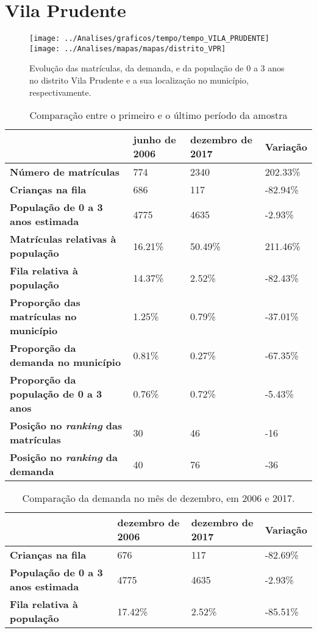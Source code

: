 \section{Vila Prudente}
\begin{figure}[H]
\centering
\texttt{[image: ../Analises/graficos/tempo/tempo\_VILA\_PRUDENTE]}
\texttt{[image: ../Analises/mapas/mapas/distrito\_VPR]}
\caption{Evolução das matrículas, da demanda, e da população de 0 a 3 anos no distrito Vila Prudente e a sua localização no município, respectivamente.}
\end{figure}
\begin{table}[H]
\begin{tabular}{l|l|l|l}
\textbf{}                                      & \textbf{junho de 2006}       & \textbf{dezembro de 2017}    & \textbf{Variação} \\ \hline
\textbf{Número de matrículas}                  & 774 & 2340 & 202.33\% \\ \hline
\textbf{Crianças na fila}                      & 686 & 117 & -82.94\% \\ \hline
\textbf{População de 0 a 3 anos estimada}      & 4775 & 4635 & -2.93\% \\ \hline
\textbf{Matrículas relativas à população}      & 16.21\% & 50.49\% & 211.46\% \\ \hline
\textbf{Fila relativa à população}             & 14.37\% & 2.52\% & -82.43\% \\ \hline
\textbf{Proporção das matrículas no município} & 1.25\% & 0.79\% & -37.01\% \\ \hline
\textbf{Proporção da demanda no município}     & 0.81\% & 0.27\% & -67.35\% \\ \hline
\textbf{Proporção da população de 0 a 3 anos}  & 0.76\% & 0.72\% & -5.43\% \\ \hline
\textbf{Posição no \textit{ranking} das matrículas}     & 30 & 46 & -16 \\ \hline
\textbf{Posição no \textit{ranking} da demanda}         & 40 & 76 & -36 \\ 
\end{tabular}
\caption{Comparação entre o primeiro e o último período da amostra}
\end{table}
\begin{table}[H]
\begin{tabular}{l|l|l|l}
\textbf{}                                 & \textbf{dezembro de 2006} & \textbf{dezembro de 2017} & \textbf{Variação} \\ \hline
\textbf{Crianças na fila}                      & 676 & 117 & -82.69\% \\ \hline
\textbf{População de 0 a 3 anos estimada}      & 4775 & 4635 & -2.93\% \\ \hline
\textbf{Fila relativa à população}             & 17.42\% & 2.52\% & -85.51\% \\
\end{tabular}
\caption{Comparação da demanda no mês de dezembro, em 2006 e 2017.}
\end{table}
